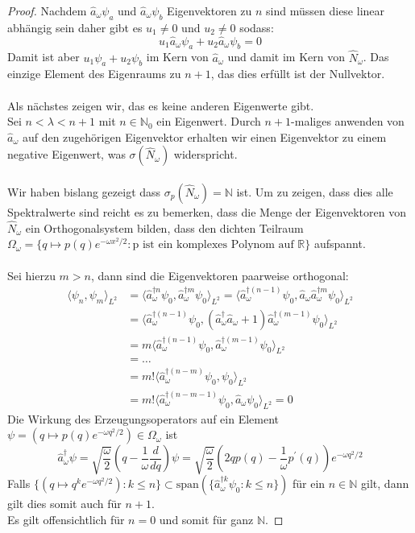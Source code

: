 \documentclass[11pt,a4paper,leqno]{report}
\numberwithin{equation}{chapter}
\begin{document}
\begin{proof}
Nachdem $\hat{a}_\omega\psi_a$ und $\hat{a}_\omega\psi_b$ Eigenvektoren zu $n$ sind m\"ussen diese linear abh\"angig sein daher gibt es $u_1\neq0$ und $u_2\neq 0$ sodass:
\begin{equation*}
	u_1\hat{a}_\omega\psi_a+u_2\hat{a}_\omega\psi_b=0
\end{equation*}
Damit ist aber $u_1\psi_a+u_2\psi_b$ im Kern von $\hat{a}_\omega$ und damit im Kern von $\hat{N}_\omega$.
Das einzige Element des Eigenraums zu $n+1$, das dies erf\"ullt ist der Nullvektor.\\
\\
Als n\"achstes zeigen wir, das es keine anderen Eigenwerte gibt.\\
Sei $n<\lambda<n+1$ mit \(n\in\mathbb{N}_0\) ein Eigenwert. Durch $n+1$-maliges anwenden von $\hat{a}_\omega$ auf den zugeh\"origen Eigenvektor erhalten wir einen Eigenvektor zu einem negative Eigenwert, was $\sigma(\hat{N}_\omega)$ widerspricht.\\
\\
Wir haben bislang gezeigt dass $\sigma_p(\hat{N}_\omega)=
\mathbb{N}$ ist. Um zu zeigen, dass dies alle Spektralwerte sind reicht es zu bemerken, dass die Menge der Eigenvektoren von $\hat{N}_\omega$ ein Orthogonalsystem bilden, dass den dichten Teilraum $\Omega_\omega=\{q\mapsto p(q)e^{-\omega x^2 / 2}: \text{p ist ein komplexes Polynom auf $\mathbb{R}$}\}$ aufspannt.
\\
\\
Sei hierzu $m>n$, dann sind die Eigenvektoren paarweise orthogonal: 
\begin{align*}
	\langle \psi_n,\psi_m\rangle_{L^2}&=
	\langle \hat{a}_\omega^{\dagger n}\psi_0,\hat{a}_\omega^{\dagger m}\psi_0\rangle_{L^2}=
	\langle \hat{a}_\omega^{\dagger (n-1)}\psi_0,\hat{a}_\omega\hat{a}_\omega^{\dagger m}\psi_0\rangle_{L^2}\\&=
	\langle \hat{a}_\omega^{\dagger (n-1)}\psi_0,(\hat{a}_\omega^\dagger \hat{a}_\omega +1)\hat{a}_\omega^{\dagger (m-1)}\psi_0\rangle_{L^2}\\&= m
	\langle \hat{a}_\omega^{\dagger (n-1)}\psi_0,\hat{a}_\omega^{\dagger (m-1)}\psi_0\rangle_{L^2}\\&=\dots\\&= m!
	\langle \hat{a}_\omega^{\dagger (n-m)}\psi_0,\psi_0\rangle_{L^2}\\&= m!
	\langle \hat{a}_\omega^{\dagger (n-m-1)}\psi_0,\hat{a}_\omega\psi_0\rangle_{L^2}=0
\end{align*}
Die Wirkung des Erzeugungsoperators auf ein Element\\ $\psi=(q\mapsto p(q)e^{-\omega q^2/2})\in\Omega_\omega$ ist
\begin{equation*}
\hat{a}_\omega^\dagger\psi  = \sqrt{\frac{\omega}{2}}(q - \frac{1}{\omega}\frac{d}{dq})\psi = \sqrt{\frac{\omega}{2}}(2qp(q)-\frac{1}{\omega}p^\prime(q) )e^{-\omega q^2/2}
\end{equation*}
Falls $\{(q\mapsto q^ke^{-\omega q^2/2}): k\leq n\}\subset \text{span}(\{\hat{a}_\omega^{\dagger k}\psi_0: k\leq n\})$ f\"ur ein $n\in\mathbb{N}$ gilt, dann gilt dies somit auch f\"ur $n+1$.\\Es gilt offensichtlich f\"ur $n=0$ und somit f\"ur ganz $\mathbb{N}$.
\end{proof}
\end{document}
